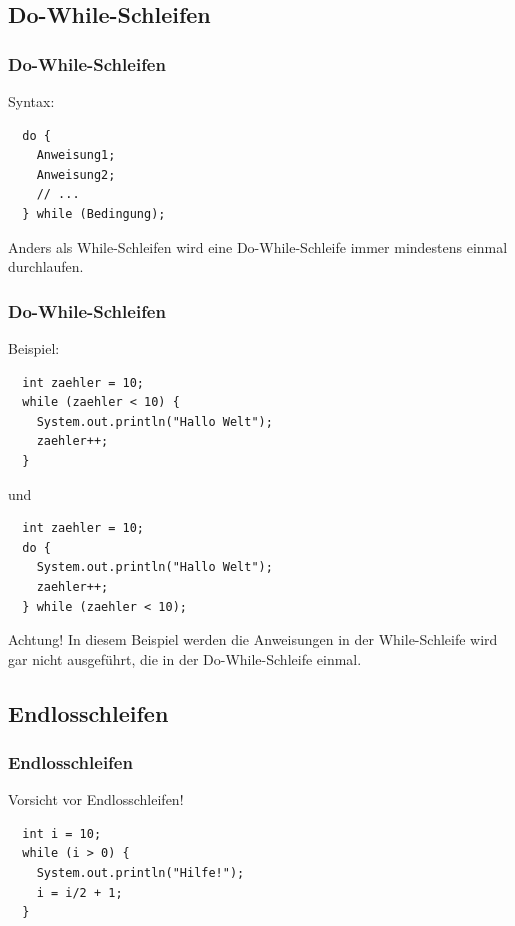 \documentclass[final]{beamer}
\begin{document}
\subsection{Do-While-Schleifen}
\begin{frame}[containsverbatim]
  \frametitle{Do-While-Schleifen}
  Syntax:
  \begin{lstlisting}
  do {
	Anweisung1;
	Anweisung2;
	// ...
  } while (Bedingung);
  \end{lstlisting}
  Anders als While-Schleifen wird eine Do-While-Schleife immer mindestens einmal durchlaufen.
\end{frame}
\begin{frame}[containsverbatim]
  \frametitle{Do-While-Schleifen}
  Beispiel:
  \begin{lstlisting}
  int zaehler = 10;
  while (zaehler < 10) {
	System.out.println("Hallo Welt");
	zaehler++;
  }
  \end{lstlisting}
  und
  \begin{lstlisting}
  int zaehler = 10;
  do {
	System.out.println("Hallo Welt");
	zaehler++;
  } while (zaehler < 10);
  \end{lstlisting}
  \begin{alertblock}{Achtung!}
    In diesem Beispiel werden die Anweisungen in der While-Schleife wird gar nicht ausgeführt, die in der Do-While-Schleife einmal.
  \end{alertblock}
\end{frame}

\subsection{Endlosschleifen}
\begin{frame}[containsverbatim]
  \frametitle{Endlosschleifen}
  Vorsicht vor Endlosschleifen!
  \begin{lstlisting}
  int i = 10;
  while (i > 0) {
	System.out.println("Hilfe!");
	i = i/2 + 1;
  }
  \end{lstlisting}
\end{frame}
\end{document}
